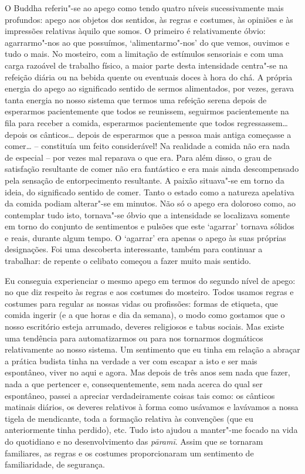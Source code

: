 O Buddha referiu"-se ao apego como tendo quatro níveis sucessivamente mais
profundos: apego aos objetos dos sentidos, às regras e costumes, às opiniões e
às impressões relativas àquilo que somos.
O primeiro é relativamente óbvio: agarrarmo"-nos ao que possuímos,
`alimentarmo"-nos' do que vemos, ouvimos e tudo o mais. No mosteiro, com a
limitação de estímulos sensoriais e com uma carga razoável de trabalho físico, a
maior parte desta intensidade centra"-se na refeição diária ou na bebida quente
ou eventuais doces à hora do chá. A própria energia do apego ao significado
sentido de sermos alimentados, por vezes, gerava tanta energia no nosso sistema
que termos uma refeição serena depois de esperarmos pacientemente que todos se
reunissem, seguirmos pacientemente na fila para receber a comida, esperarmos
pacientemente que todos regressassem\ldots{} depois os cânticos\ldots{} depois
de esperarmos que a pessoa mais antiga começasse a comer\ldots{} -- constituía
um feito considerável! Na realidade a comida não era nada de especial -- por
vezes mal reparava o que era. Para além disso, o grau de satisfação resultante
de comer não era fantástico e era mais ainda descompensado pela sensação de
entorpecimento resultante. A paixão situava"-se em torno da ideia, do
significado sentido de comer. Tanto o estado como a natureza apelativa da comida
podiam alterar"-se em minutos. Não só o apego era doloroso como, ao contemplar
tudo isto, tornava"-se óbvio que a intensidade se localizava somente em torno do
conjunto de sentimentos e pulsões que este `agarrar' tornava sólidos e reais,
durante algum tempo. O `agarrar' era apenas o apego às suas próprias
designações. Foi uma descoberta interessante, também para continuar a trabalhar:
de repente o celibato começou a fazer muito mais sentido.

Eu conseguia experienciar o mesmo apego em termos do segundo nível de apego: no
que diz respeito às regras e aos costumes do mosteiro. Todos usamos regras e
costumes para regular as nossas vidas ou profissões: formas de etiqueta, que
comida ingerir (e a que horas e dia da semana), o modo como gostamos que o nosso
escritório esteja arrumado, deveres religiosos e tabus sociais. Mas existe uma
tendência para automatizarmos ou para nos tornarmos dogmáticos relativamente ao
nosso sistema. Um sentimento que eu tinha em relação a abraçar a prática budista
tinha na verdade a ver com escapar a isto e ser mais espontâneo, viver no aqui e
agora. Mas depois de três anos sem nada que fazer, nada a que pertencer e,
consequentemente, sem nada acerca do qual ser espontâneo, passei a apreciar
verdadeiramente coisas tais como: os cânticos matinais diários, os deveres
relativos à forma como usávamos e lavávamos a nossa tigela de mendicante, toda a
formação relativa às convenções (que eu anteriormente tinha perdido), etc. Tudo
isto ajudou a manter"-me focado na vida do quotidiano e no desenvolvimento das
\emph{pāramī}. Assim que se tornaram familiares, as regras e os costumes
proporcionaram um sentimento de familiaridade, de segurança.

